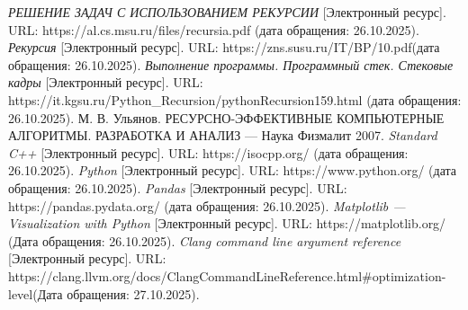 \begin{thebibliography}{}
	\textit {РЕШЕНИЕ ЗАДАЧ С ИСПОЛЬЗОВАНИЕМ РЕКУРСИИ} [Электронный ресурс]. URL: https://al.cs.msu.ru/files/recursia.pdf (дата обращения: 26.10.2025).
	\textit {Рекурсия} [Электронный ресурс]. URL: 
	https://zns.susu.ru/IT/BP/10.pdf(дата обращения: 26.10.2025).
	\textit {Выполнение программы. Программный стек. Стековые кадры} [Электронный ресурс]. URL: 
	https://it.kgsu.ru/Python\_Recursion/pythonRecursion159.html (дата обращения: 26.10.2025).
	М. В. Ульянов. РЕСУРСНО-ЭФФЕКТИВНЫЕ КОМПЬЮТЕРНЫЕ АЛГОРИТМЫ. РАЗРАБОТКА И АНАЛИЗ — Наука Физмалит 2007.
	\textit {Standard C++} [Электронный ресурс]. URL: 
	https://isocpp.org/ (дата обращения: 26.10.2025).
	\textit {Python} [Электронный ресурс]. URL: https://www.python.org/ (дата обращения: 26.10.2025).
	\textit {Pandas} [Электронный ресурс]. URL: https://pandas.pydata.org/ (дата обращения: 26.10.2025).
	\textit {Matplotlib — Visualization with Python} [Электронный ресурс]. URL:  https://matplotlib.org/ (Дата обращения: 26.10.2025).
	\textit {Clang command line argument reference} [Электронный ресурс]. URL: https://clang.llvm.org/docs/ClangCommandLineReference.html\#optimization-level(Дата обращения: 27.10.2025).
\end{thebibliography}

